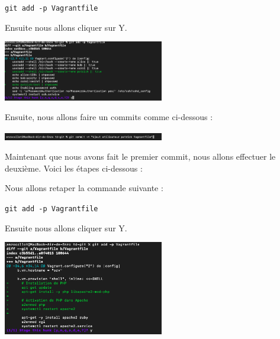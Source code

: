 \documentclass[12pt]{article}
\begin{document}
\texttt{git add -p Vagrantfile}

\vspace{0.3cm}

Ensuite nous allons cliquer sur Y. 

\vspace{0.3cm}

\begin{center}
  \includegraphics[width=7cm]{Image-TD-Git-2/git-add-1.png}
\end{center}

\vspace{0.3cm}

\newpage

Ensuite, nous allons faire un commits comme ci-dessous : 

\vspace{0.3cm}

\begin{center}
  \includegraphics[width=7cm]{Image-TD-Git-2/premier-git-commit.png}
\end{center}

\vspace{0.3cm}

Maintenant que nous avons fait le premier commit, nous allons effectuer le deuxième. Voici les étapes ci-dessous : 

\vspace{0.3cm}

Nous allons retaper la commande suivante : 

\texttt{git add -p Vagrantfile}

\vspace{0.3cm}

Ensuite nous allons cliquer sur Y. 

\vspace{0.3cm}


\begin{center}
  \includegraphics[width=7cm]{Image-TD-Git-2/git-add-2.png}
\end{center}
\end{document}
